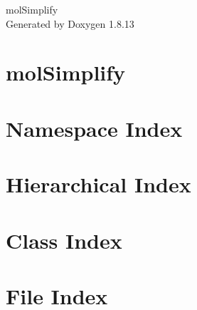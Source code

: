 \documentclass[twoside]{book}
\newcommand{\+}{\discretionary{\mbox{\scriptsize$\hookleftarrow$}}{}{}}
\newcommand{\clearemptydoublepage}{%
  \newpage{\pagestyle{empty}\cleardoublepage}%
}
\begin{document}
\hypersetup{pageanchor=false,
             bookmarksnumbered=true,
             pdfencoding=unicode
            }
\begin{titlepage}
\vspace*{7cm}
\begin{center}%
{\Large mol\+Simplify }\\
\vspace*{1cm}
{\large Generated by Doxygen 1.8.13}\\
\end{center}
\end{titlepage}
\clearemptydoublepage
{}
\tableofcontents
\clearemptydoublepage
{}
\hypersetup{pageanchor=true}

\chapter{mol\+Simplify}
\label{md_README}

\chapter{Namespace Index}

\chapter{Hierarchical Index}

\chapter{Class Index}

\chapter{File Index}

\end{document}
